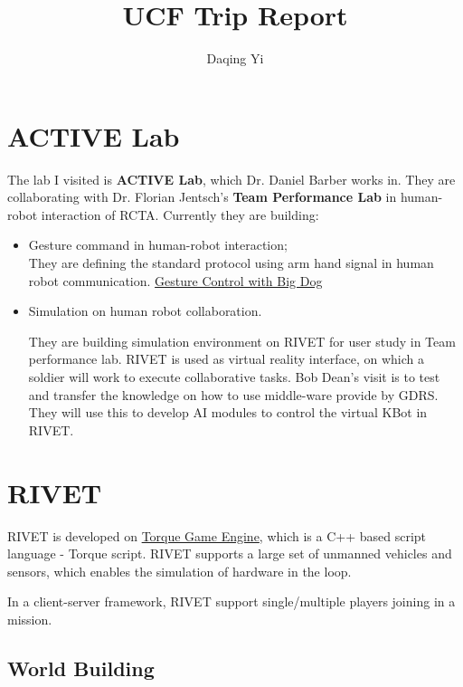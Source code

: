 \documentclass[12pt]{article}
\begin{document}
\title{\textsf{UCF Trip Report}}
\author{\textsf{Daqing Yi}}
\date{\textsf{}}

\maketitle

\section{ACTIVE Lab}

The lab I visited is \textbf{ACTIVE Lab}, which Dr. Daniel Barber works in. They are collaborating with Dr. Florian Jentsch's \textbf{Team Performance Lab} in human-robot interaction of RCTA.
Currently they are building:
\begin{itemize}
\item Gesture command in human-robot interaction; \\

They are defining the standard protocol using arm hand signal in human robot communication. 
\href{http://www.youtube.com/watch?v=IiXrYnRdyPs}{Gesture Control with Big Dog}
 
\item Simulation on human robot collaboration.

They are building simulation environment on RIVET for user study in Team performance lab. RIVET is used as virtual reality interface, on which a soldier will work to execute collaborative tasks. Bob Dean's visit is to test and transfer the knowledge on how to use middle-ware provide by GDRS. They will use this to develop AI modules to control the virtual KBot in RIVET.

\end{itemize}

\section{RIVET}

RIVET is developed on \href{http://www.garagegames.com/products/torque-3d}{Torque Game Engine}, which is a C++ based script language - Torque script. RIVET supports a large set of unmanned vehicles and sensors, which enables the simulation of hardware in the loop.

In a client-server framework, RIVET support single/multiple players joining in a mission. 

\subsection{World Building}
\end{document}
